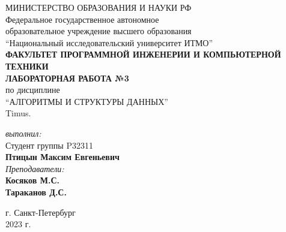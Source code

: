 \begin{center}
	МИНИСТЕРСТВО ОБРАЗОВАНИЯ И НАУКИ РФ\\
	\hfill \break
	Федеральное государственное автономное\\
	образовательное учреждение высшего образования\\
	``Национальный исследовательский университет ИТМО''\\
	\hfill \break
	\textbf{ФАКУЛЬТЕТ ПРОГРАММНОЙ ИНЖЕНЕРИИ И КОМПЬЮТЕРНОЙ ТЕХНИКИ}\\
	\vspace{2cm}
	\large{\textbf{ЛАБОРАТОРНАЯ РАБОТА №3}}\\
	\hfill \break
	по дисциплине\\
	\large{``АЛГОРИТМЫ И СТРУКТУРЫ ДАННЫХ''}\\
	Timus.\\
	\hfill \break
	\vspace{3cm}
	\begin{flushright}
	\textit{выполнил:}\\
	Студент группы P32311\\
	\textbf{Птицын Максим Евгеньевич}\\
	\textit{Преподаватели:}\\
	\textbf{Косяков М.С.} \\
	\textbf{Тараканов Д.С.}
	\end{flushright}
\end{center}

\vfill

\begin{center} г. Санкт-Петербург\\2023 г.
\end{center}
\thispagestyle{empty}

\newpage
